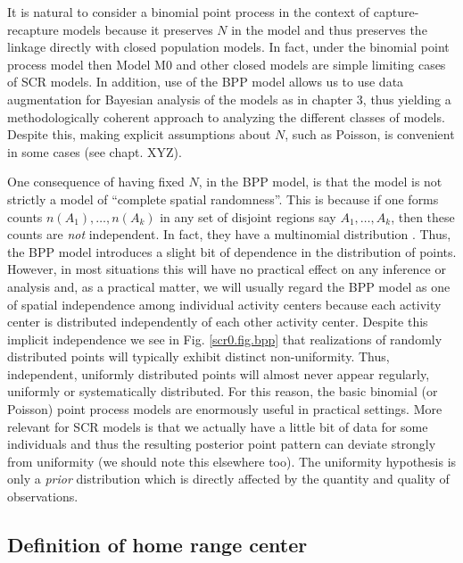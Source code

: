 It is natural to consider a binomial point process in the context of
capture-recapture models because it preserves $N$ in the model and thus
preserves the linkage directly with closed population models. In fact,
under the binomial point process model then Model M0 and other closed
models are simple limiting cases of SCR models. In addition, use of
the BPP model allows us to use data augmentation for Bayesian analysis
of the models as in chapter 3, thus yielding a methodologically
coherent approach to analyzing the different classes of
models. Despite this, making explicit assumptions about $N$, such as
Poisson, is convenient in some cases (see chapt. XYZ). 

One consequence of having fixed $N$, in the BPP model, is that the 
model is not strictly a model of ``complete spatial randomness''. This is
because if one forms counts 
$n(A_{1}),\ldots, n(A_{k})$
in any set of disjoint regions say $A_{1}, \ldots, A_{k}$,
then these counts are {\it not} independent.
In fact, they have a multinomial distribution 
\citep[see][p. XYZ]{illian_etal:2008}. Thus, the BPP model introduces a
slight bit of dependence in the distribution of points. However, in
most situations this will have no practical effect on any inference or
analysis and, as a practical matter, we will usually regard the BPP
model as one of spatial independence among individual activity centers
because each activity center is distributed independently of each
other activity center. Despite this implicit independence we see in
Fig. \ref{scr0.fig.bpp} that realizations of randomly distributed points
will typically exhibit distinct non-uniformity. Thus, independent,
uniformly distributed points will almost never appear regularly,
uniformly or systematically distributed. For this reason, the basic
binomial (or Poisson) point process models are enormously useful in
practical settings.  More relevant for SCR models is that we actually
have a little bit of data for some individuals and thus the resulting
posterior point pattern can deviate strongly from uniformity (we
should note this elsewhere too). The uniformity hypothesis is only a
{\it prior} distribution which is directly affected by the quantity
and quality of observations.


\subsection{Definition of home range center}

